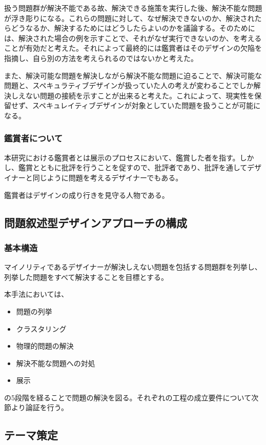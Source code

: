 \documentclass{jsarticle}
\begin{document}
扱う問題群が解決不能である故、解決できる施策を実行した後、解決不能な問題が浮き彫りになる。これらの問題に対して、なぜ解決できないのか、解決されたらどうなるか、解決するためにはどうしたらよいのかを議論する。そのためには、解決された場合の例を示すことで、それがなぜ実行できないのか、を考えることが有効だと考えた。それによって最終的には鑑賞者はそのデザインの欠陥を指摘し、自ら別の方法を考えられるのではないかと考えた。

また、解決可能な問題を解決しながら解決不能な問題に迫ることで、解決可能な問題と、スペキュラティブデザインが扱っていた人の考えが変わることでしか解決しえない問題の接続を示すことが出来ると考えた。これによって、現実性を保留せず、スペキュレイティブデザインが対象としていた問題を扱うことが可能になる。

\subsubsection{鑑賞者について}
本研究における鑑賞者とは展示のプロセスにおいて、鑑賞した者を指す。しかし、鑑賞とともに批評を行うことを促すので、批評者であり、批評を通してデザイナーと同じように問題を考えるデザイナーでもある。

鑑賞者はデザインの成り行きを見守る人物である。

\newpage
\subsection{問題叙述型デザインアプローチの構成}
\subsubsection{基本構造}
マイノリティであるデザイナーが解決しえない問題を包括する問題群を列挙し、列挙した問題をすべて解決することを目標とする。

本手法においては、
\begin{itemize}
  \item{問題の列挙}
  \item{クラスタリング}
  \item{物理的問題の解決}
  \item{解決不能な問題への対処}
  \item{展示}
\end{itemize}
の5段階を経ることで問題の解決を図る。それぞれの工程の成立要件について次節より論証を行う。

\subsection{テーマ策定}
\end{document}
